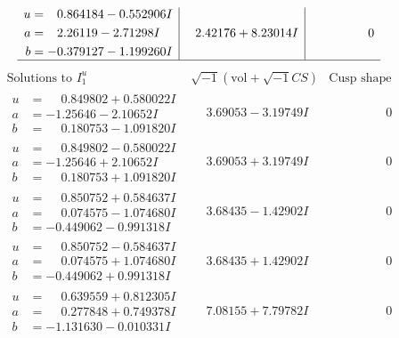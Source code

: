 \documentclass[1p]{elsarticle_modified}
\theoremstyle{definition}
\newcommand{\I}{\sqrt{-1}}
\begin{document}
$$\begin{array}{c|c|c}
\begin{aligned}
u &= \phantom{-}0.864184 - 0.552906 I \\
a &= \phantom{-}2.26119 - 2.71298 I \\
b &= -0.379127 - 1.199260 I\end{aligned}
 & \phantom{-}2.42176 + 8.23014 I & \phantom{-0.000000 } 0\\
 \hline 
 \end{array}$$\newpage$$\begin{array}{c|c|c}  
\text{Solutions to }I^u_{1}& \I (\text{vol} + \sqrt{-1}CS) & \text{Cusp shape}\\
 \hline 
\begin{aligned}
u &= \phantom{-}0.849802 + 0.580022 I \\
a &= -1.25646 - 2.10652 I \\
b &= \phantom{-}0.180753 - 1.091820 I\end{aligned}
 & \phantom{-}3.69053 - 3.19749 I & \phantom{-0.000000 } 0 \\ \hline\begin{aligned}
u &= \phantom{-}0.849802 - 0.580022 I \\
a &= -1.25646 + 2.10652 I \\
b &= \phantom{-}0.180753 + 1.091820 I\end{aligned}
 & \phantom{-}3.69053 + 3.19749 I & \phantom{-0.000000 } 0 \\ \hline\begin{aligned}
u &= \phantom{-}0.850752 + 0.584637 I \\
a &= \phantom{-}0.074575 - 1.074680 I \\
b &= -0.449062 - 0.991318 I\end{aligned}
 & \phantom{-}3.68435 - 1.42902 I & \phantom{-0.000000 } 0 \\ \hline\begin{aligned}
u &= \phantom{-}0.850752 - 0.584637 I \\
a &= \phantom{-}0.074575 + 1.074680 I \\
b &= -0.449062 + 0.991318 I\end{aligned}
 & \phantom{-}3.68435 + 1.42902 I & \phantom{-0.000000 } 0 \\ \hline\begin{aligned}
u &= \phantom{-}0.639559 + 0.812305 I \\
a &= \phantom{-}0.277848 + 0.749378 I \\
b &= -1.131630 - 0.010331 I\end{aligned}
 & \phantom{-}7.08155 + 7.79782 I & \phantom{-0.000000 } 0 \\ \hline\begin{aligned}

\end{aligned}
\end{array}$$
\end{document}
